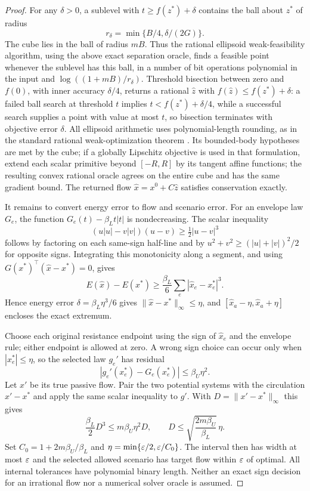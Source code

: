 \begin{proof}
For any $\delta>0$, a sublevel with $t\ge f(z^*)+\delta$ contains the
ball about $z^*$ of radius
\[
 r_\delta=\min\{B/4,\delta/(2G)\}.
\]
The cube lies in the ball of radius $mB$. Thus the rational ellipsoid
weak-feasibility algorithm, using the above exact separation oracle,
finds a feasible point whenever the sublevel has this ball, in a number
of bit operations polynomial in the input and
$\log((1+mB)/r_\delta)$. Threshold bisection between zero and $f(0)$,
with inner accuracy $\delta/4$, returns a rational $\widehat z$ with
$f(\widehat z)\le f(z^*)+\delta$: a failed ball search at threshold
$t$ implies $t<f(z^*)+\delta/4$, while a successful search supplies a
point with value at most $t$, so bisection terminates with objective
error $\delta$.
All ellipsoid arithmetic uses polynomial-length rounding, as in the
standard rational weak-optimization theorem
\citep[Theorem 2.5.9]{dadush2012-integer-programming}.
Its bounded-body hypotheses are met by the cube; if a globally
Lipschitz objective is used in that formulation, extend each scalar
primitive beyond $[-R,R]$ by its tangent affine functions; the resulting
convex rational oracle agrees on the entire cube and has the same
gradient bound. The returned flow $\widehat x=x^0+C\widehat z$
satisfies conservation exactly.

It remains to convert energy error to flow and scenario error. For an
envelope law $G_e$, the function $G_e(t)-\beta_Lt|t|$ is nondecreasing.
The scalar inequality
\[
 (u|u|-v|v|)(u-v)\ge\tfrac12|u-v|^3
\]
follows by factoring on each same-sign half-line and by
$u^2+v^2\ge(|u|+|v|)^2/2$ for opposite signs. Integrating this
monotonicity along a segment, and using
$G(x^*)^\top(\widehat x-x^*)=0$, gives
\begin{equation}
 E(\widehat x)-E(x^*)\ge
 \frac{\beta_L}{6}\sum_e|\widehat x_e-x_e^*|^3.
 \label{eq:a-bound-energy-error}
\end{equation}
Hence energy error $\delta=\beta_L\eta^3/6$ gives
$\|\widehat x-x^*\|_\infty\le\eta$, and
$[\widehat x_a-\eta,\widehat x_a+\eta]$ encloses the exact extremum.

Choose each original resistance endpoint using the sign of
$\widehat x_e$ and the envelope rule; either endpoint is allowed at
zero. A wrong sign choice can occur only when $|x_e^*|\le\eta$,
so the selected law $g_e'$ has residual
\[
 |g_e'(x_e^*)-G_e(x_e^*)|\le\beta_U\eta^2.
\]
Let $x'$ be its true passive flow. Pair the two potential systems with
the circulation $x'-x^*$ and apply the same scalar inequality to $g'$.
With $D=\|x'-x^*\|_\infty$ this gives
\[
 \frac{\beta_L}{2}D^3\le m\beta_U\eta^2D,
 \qquad D\le\sqrt{\frac{2m\beta_U}{\beta_L}}\,\eta.
\]
Set $C_0=1+2m\beta_U/\beta_L$ and
$\eta=\min\{\varepsilon/2,\varepsilon/C_0\}$. The interval then has width at most
$\varepsilon$ and the selected allowed scenario has target flow within
$\varepsilon$ of optimal. All internal tolerances have polynomial binary
length. Neither an exact sign decision for an irrational flow nor a
numerical solver oracle is assumed.
\end{proof}

